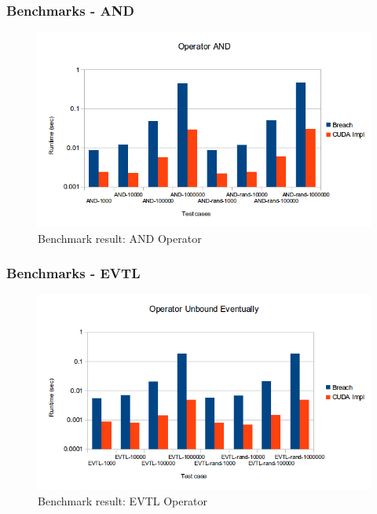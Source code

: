 \documentclass[notes=show]{beamer}
\begin{document}
\begin{frame}
\frametitle{Benchmarks - AND}
\begin{figure}[H]
    \includegraphics[scale=0.5]{bm_and.png}
    \caption{
        \label{fig:bm_and}
        Benchmark result: AND Operator}
\end{figure}
\end{frame}

\begin{frame}
\frametitle{Benchmarks - EVTL}
\begin{figure}[H]
    \includegraphics[scale=0.5]{bm_evtl.png}
    \caption{
        \label{fig:bm_evtl}
        Benchmark result: EVTL Operator}
\end{figure}
\end{frame}
\end{document}
